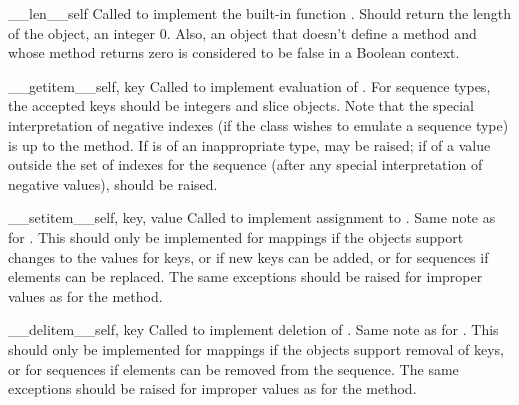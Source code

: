 \begin{methoddesc}{__len__}{self}
Called to implement the built-in function
.  Should return the length of the
object, an integer \code{>=} 0.  Also, an object that doesn't define a
 method and whose  method
returns zero is considered to be false in a Boolean context.
\end{methoddesc}

\begin{methoddesc}{__getitem__}{self, key}
Called to implement evaluation of .
For sequence types, the accepted keys should be integers and slice
objects.  Note that
the special interpretation of negative indexes (if the class wishes to
emulate a sequence type) is up to the  method.
If  is of an inappropriate type,  may be
raised; if of a value outside the set of indexes for the sequence
(after any special interpretation of negative values),
 should be raised.
\end{methoddesc}

\begin{methoddesc}{__setitem__}{self, key, value}
Called to implement assignment to .  Same
note as for .  This should only be implemented
for mappings if the objects support changes to the values for keys, or
if new keys can be added, or for sequences if elements can be
replaced.  The same exceptions should be raised for improper
 values as for the  method.
\end{methoddesc}

\begin{methoddesc}{__delitem__}{self, key}
Called to implement deletion of .  Same
note as for .  This should only be implemented
for mappings if the objects support removal of keys, or for sequences
if elements can be removed from the sequence.  The same exceptions
should be raised for improper  values as for the
 method.
\end{methoddesc}


